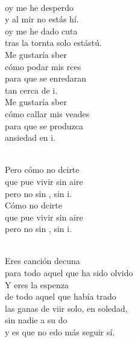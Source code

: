 \begin{cancion}%
	    \\
	oy me he desperdo\\
	y al mir no estás hí.\\
	oy me he dado cuta\\
	tras la tornta solo estástú.\\
\jump
	Me gustaría sber\\
	cómo podar mis rces \\
	para que  se enredaran\\
	tan cerca de i.\\
\jump
	Me gustaría sber\\
	cómo callar mis veades\\
	para que  se produzca \\
	ansiedad en i.\\\jump\\
	\begin{chorus}%
	Pero cómo no dcirte\\
	que pue vivir sin aire\\
	pero no sin , sin i.\\
\jump
	Cómo no dcirte\\
	que pue vivir sin aire\\
	pero no sin , sin i.\\
	\end{chorus}%
	\jump\\
	Eres canción decuna\\
	para todo aquel que ha sido olvido\\
	Y eres la espenza \\
	de todo aquel que había trado\\
	las ganas de viir solo, en soledad,\\
	sin nadie a su do\\
	y es que no edo más seguir sí.\\\jump\\
	\begin{chorus}%

\end{chorus}
\end{cancion}

